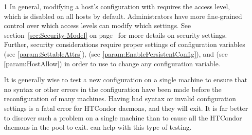\begin{ManPage}{\label{man-condor-config-val}}{1}
In general, modifying a host's configuration with
requires the  access level, which is disabled on all
hosts by default.
Administrators have more
fine-grained control over which access levels can modify which
settings.
See section~\ref{sec:Security-Model} on
page~\pageref{sec:Security-Model} for more details on security settings.
Further, security considerations require proper settings of
configuration variables
 (see \ref{param:SettableAttrs}),
 (see \ref{param:EnablePersistentConfig}),
and  (see \ref{param:HostAllow})
in order to use  to change any configuration variable.

It is generally wise to test a new configuration on a single
machine to ensure that no syntax or other errors in the
configuration have been made before the reconfiguration of many machines.  
Having bad syntax or invalid configuration settings is a fatal error
for HTCondor daemons, and they will exit.
It is far better to discover such a problem on a single machine than to
cause all the HTCondor daemons in the pool to exit.
 can help with this type of testing.


\end{ManPage}
